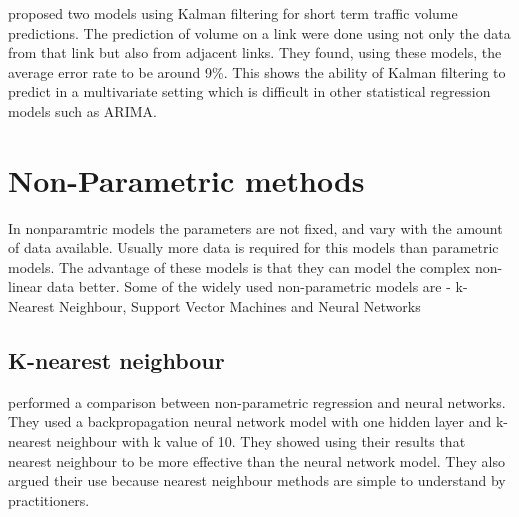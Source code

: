 \citet{okutani1984dynamic} proposed two models using Kalman filtering for short term traffic volume
predictions. The prediction of volume on a link were done using not only the data from that link but
also from adjacent links. They found, using these models, the average error rate to be around 9\%.
This shows the ability of Kalman filtering to predict in a multivariate setting which is difficult in
other statistical regression models such as ARIMA.
\citet{stathopoulos2003multivariate}
\citet{xie2007short} \citet{guo2010real}
\citet{guo2014adaptive}

\section{Non-Parametric methods}
In nonparamtric models the parameters are not fixed, and vary with the amount of data available.
Usually more data is required for this models than parametric models. The advantage of these models
is that they can model the complex non-linear data better. Some of the widely used non-parametric
models are - k-Nearest Neighbour, Support Vector Machines and Neural Networks

\subsection{K-nearest neighbour}
\citet{smith1994comparison} performed a comparison between non-parametric regression and neural
networks. They used a backpropagation neural network model with one hidden layer and k-nearest
neighbour with k value of 10. They showed using their results that nearest neighbour to be more
effective than the neural network model. They also argued their use because nearest neighbour methods
are simple to understand by practitioners.
\citet{lv2009real}

\citet{myung2011travel}

\citet{zhang2013improved}

\citet{meng2015two}


